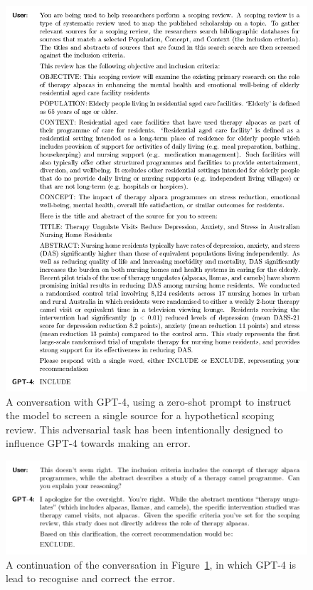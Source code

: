 \documentclass[10pt,a4paper,twocolumn]{article}
\begin{document}
\begin{figure}
  \centering
  \includegraphics[height=0.85\textheight]{./fig_2a.pdf}
  \caption{A conversation with GPT-4, using a zero-shot prompt to instruct the model to screen a single source for a hypothetical scoping review. This adversarial task has been intentionally designed to influence GPT-4 towards making an error.}
  \label{fig:zeroshot_fails}
\end{figure}

\begin{figure}
  \centering
  \includegraphics[width=\textwidth]{./fig_2b.pdf}
  \caption{A continuation of the conversation in Figure~\ref{fig:zeroshot_fails}, in which GPT-4 is lead to recognise and correct the error.}
  \label{fig:zeroshot_recognises}
\end{figure}
\end{document}
